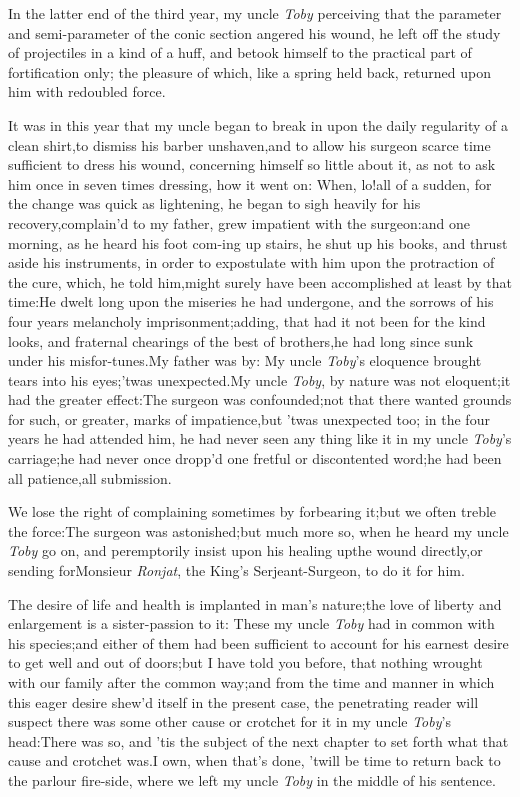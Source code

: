 \documentclass{article}
\begin{document}
In the latter end of the third year, my uncle \textit{Toby}
perceiving that the parameter and semi-parameter of the conic
section angered his wound, he left off the study of projectiles in
a kind of a huff, and betook himself to the practical part of
fortification only; the pleasure of which, like a spring held back,
returned upon him with redoubled force.

It was in this year that my uncle began to break in upon the daily regularity of a clean
shirt,\tsh to dismiss his barber
unshaven,\tsh and to allow his surgeon\pb
scarce time
sufficient to dress his wound, concerning himself so little about
it, as not to ask him once in seven times dressing, how it went on:
When, lo!\tsk all of a sudden, for the change was quick as
lightening, he began to sigh heavily for his
recovery,\tsk complain’d to my father, grew impatient with
the surgeon:\tsk and one morning, as he heard his foot
com-\break ing up stairs, he shut up his books, and thrust aside his
instruments, in order to expostulate with him upon the protraction
of the cure, which, he told him,\break might surely have been
accomplished at least by that time:\tsk He dwelt long upon the
miseries he had undergone, and the sorrows of his four years
melancholy\break
imprisonment;\tsh adding, that had it not been
for the kind looks, and fraternal chearings of the best of
brothers,\tsk he had long since sunk under his
misfor-\pb tunes.\tsh My father was by: My uncle
\textit{Toby}’s eloquence brought tears into his eyes;\tsh ’twas
unexpected.\tsh My uncle \textit{Toby}, by nature was not
eloquent;\tsk\break it had the greater effect:\tsk The surgeon
was confounded;\tsk not that there wanted grounds for
such, or greater, marks of impatience,\tsk but ’twas
unexpected too; in the four years he had attended him, he had never
seen any thing like it in my uncle \textit{Toby}’s carriage;\tsk he
had never once dropp’d one fretful or discontented
word;\tsk he had been all patience,\tsk all
submission.

\tsk We lose the right of complaining sometimes by forbearing
it;\tsk but we often treble the force:\tsk The surgeon was
astonished;\tsk but much more so, when he heard my uncle \textit{Toby} go on,
and peremptorily insist upon his healing up\pb the wound
directly,\tsh or sending for\break Monsieur \textit{Ronjat}, the
King’s Serjeant-\break Surgeon, to do it for him.

The desire of life and health is implanted in man’s
nature;\tsh the love of liberty and enlargement is a
sister-passion to it: These my uncle \textit{Toby} had in common with
his species;\tsk and either of them had been sufficient to account for his earnest
desire to get well and out of doors;\tsk but I have told
you before, that nothing wrought with our family after the common
way;\tsh and from the time and manner in which this eager
desire shew’d itself in the present case, the penetrating reader
will suspect there was some other cause or crotchet for it in my
uncle \textit{Toby}’s head:\tsk There was so, and
’tis the subject of the next chapter to set forth what that
cause and crotchet was.\pb I own, when that’s done, ’twill
be time to return back to the parlour fire-side, where we left my
uncle \textit{Toby} in the middle of his sentence.
\end{document}
